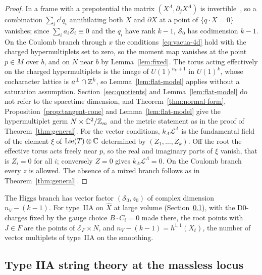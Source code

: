 \begin{proof}
In a frame with a prepotential the matrix $(X^\Lambda,\partial_jX^\Lambda)$ is
invertible~\cite[Sect.~4, on the existence of a prepotential]{crapsetal1997specialgeometry}, so a
combination $\sum_ic^iq_i$ annihilating both $X$ and $\partial X$ at a point of $\{q\cdot X=0\}$ vanishes;
since $\sum_ia_iZ_i\equiv0$ and the $q_i$ have rank $k-1$, $\mathcal S_0$ has codimension $k-1$. On the
Coulomb branch through $x$ the conditions~\eqref{eq:vacua-4d} hold with the charged hypermultiplets set
to zero, so the moment map vanishes at the point $p\in M$ over $b$, and on $N$ near $b$ by
Lemma~\ref{lem:fixed}. The torus acting effectively on the charged hypermultiplets is the image of
$U(1)^{n_V+1}$ in $U(1)^k$, whose cocharacter lattice is $a^\perp\cap\mathbb Z^k$, so Lemma~\ref{lem:flat-model}
applies without a saturation assumption. Section~\ref{sec:quotients} and Lemma~\ref{lem:flat-model} do
not refer to the spacetime dimension, and Theorem~\ref{thm:normal-form},
Proposition~\ref{prop:tangent-cone} and Lemma~\ref{lem:flat-model} give the hypermultiplet germ
$N\times\mathbb C^2/\mathbb Z_m$ and the metric statement as in the proof of Theorem~\ref{thm:general}. For the
vector conditions, $k_\Lambda\mathcal L^\Lambda$ is the fundamental field of the element $\xi$ of
$\mathrm{Lie}(T)\otimes\mathbb C$ determined by $(Z_1,\dots,Z_k)$. Off the root the effective torus acts freely
near $p$, so the real and imaginary parts of $\xi$ vanish, that is $Z_i=0$ for all $i$; conversely $Z=0$
gives $k_\Lambda\mathcal L^\Lambda=0$. On the Coulomb branch every $z$ is allowed. The absence of a mixed
branch follows as in Theorem~\ref{thm:general}.
\end{proof}

The Higgs branch has vector factor $(\mathcal S_0,z_0)$ of complex dimension $n_V-(k-1)$. For type~IIA on
$\widehat X$ at large volume (Section~\ref{subsec:iia}), with the D0-charges fixed by the gauge choice
$B\cdot C_i=0$ made there, the root points with $J\in F$ are the points of $\mathcal E_F\times N$,
and $n_V-(k-1)=h^{1,1}(X_t)$, the number of vector multiplets of type~IIA on the smoothing.

\subsection{Type IIA string theory at the massless locus}
\label{subsec:iia}

